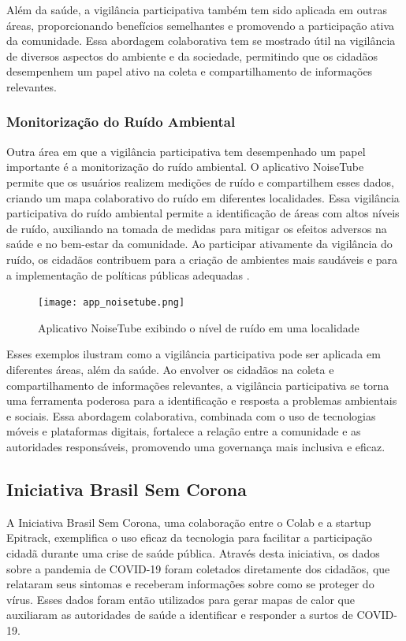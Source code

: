 Além da saúde, a vigilância participativa também tem sido aplicada em outras áreas, proporcionando benefícios semelhantes e promovendo a participação ativa da comunidade. Essa abordagem colaborativa tem se mostrado útil na vigilância de diversos aspectos do ambiente e da sociedade, permitindo que os cidadãos desempenhem um papel ativo na coleta e compartilhamento de informações relevantes.

\subsubsection*{Monitorização do Ruído Ambiental}
Outra área em que a vigilância participativa tem desempenhado um papel importante é a monitorização do ruído ambiental. O aplicativo NoiseTube permite que os usuários realizem medições de ruído e compartilhem esses dados, criando um mapa colaborativo do ruído em diferentes localidades. Essa vigilância participativa do ruído ambiental permite a identificação de áreas com altos níveis de ruído, auxiliando na tomada de medidas para mitigar os efeitos adversos na saúde e no bem-estar da comunidade. Ao participar ativamente da vigilância do ruído, os cidadãos contribuem para a criação de ambientes mais saudáveis e para a implementação de políticas públicas adequadas \cite{2010_Arnand}.

\begin{figure}[!htb]
	\caption{Aplicativo NoiseTube exibindo o nível de ruído em uma localidade}
	\label{fig
	}
	\centering
	\texttt{[image: app\_noisetube.png]}
	\end{figure}

Esses exemplos ilustram como a vigilância participativa pode ser aplicada em diferentes áreas, além da saúde. Ao envolver os cidadãos na coleta e compartilhamento de informações relevantes, a vigilância participativa se torna uma ferramenta poderosa para a identificação e resposta a problemas ambientais e sociais. Essa abordagem colaborativa, combinada com o uso de tecnologias móveis e plataformas digitais, fortalece a relação entre a comunidade e as autoridades responsáveis, promovendo uma governança mais inclusiva e eficaz.

\subsection*{Iniciativa Brasil Sem Corona}
A Iniciativa Brasil Sem Corona, uma colaboração entre o Colab e a startup Epitrack, exemplifica o uso eficaz da tecnologia para facilitar a participação cidadã durante uma crise de saúde pública. Através desta iniciativa, os dados sobre a pandemia de COVID-19 foram coletados diretamente dos cidadãos, que relataram seus sintomas e receberam informações sobre como se proteger do vírus. Esses dados foram então utilizados para gerar mapas de calor que auxiliaram as autoridades de saúde a identificar e responder a surtos de COVID-19.

